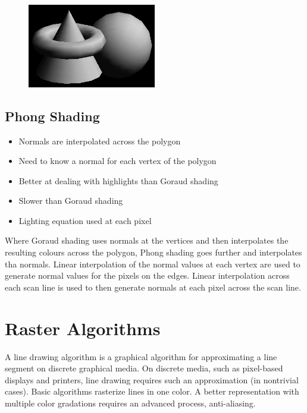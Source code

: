 \documentclass{mini}
\begin{document}
\begin{figure}[H]
    \centering
    \includegraphics[width=0.5\textwidth]{./images/goraud_shade.jpg}
    \caption{}
    \label{fig:goraud_shade}
\end{figure}

\subsection{Phong Shading}

\begin{itemize}
    \item Normals are interpolated across the polygon
    \item Need to know a normal for each vertex of the polygon
    \item Better at dealing with highlights than Goraud shading
    \item Slower than Goraud shading
    \item Lighting equation used at each pixel
\end{itemize}
Where Goraud shading uses normals at the vertices and then interpolates the resulting colours across the polygon, Phong shading goes further and interpolates tha normals. Linear interpolation of the normal values at each vertex are used to generate normal values for the pixels on the edges. Linear interpolation across each scan line is used to then generate normals at each pixel across the scan line.


\section{Raster Algorithms}

A line drawing algorithm is a graphical algorithm for approximating a line segment on discrete graphical media. On discrete media, such as pixel-based displays and printers, line drawing requires such an approximation (in nontrivial cases). Basic algorithms rasterize lines in one color. A better representation with multiple color gradations requires an advanced process, anti-aliasing.
\end{document}
